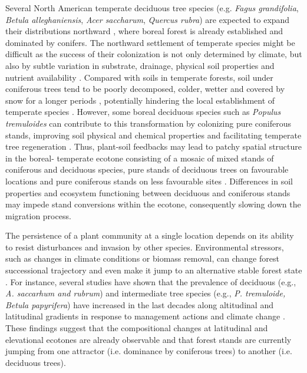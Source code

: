 Several North American temperate deciduous tree species (e.g. \textit{Fagus grandifolia},
\textit{Betula alleghaniensis}, \textit{Acer saccharum}, \textit{Quercus rubra}) are expected to
expand their distributions northward \citep{Iverson2002,Sciences2014}, where boreal forest is
already established and dominated by conifers. The northward settlement of temperate species might
be difficult as the success of their colonization is not only determined by climate, but also by
subtle variation in substrate, drainage, physical soil properties and nutrient availability
\citep{Goldblum2010, Lafleur2010, Brown2014}. Compared with soils in temperate forests, soil  under
coniferous trees tend to be poorly decomposed, colder, wetter and covered by snow for a longer
periods \citep{Barras1998, Lafleur2010, Goldblum2010}, potentially hindering the local establishment
of temperate species \citep{Lafleur2010, Brown2014}. However, some boreal deciduous species such as
\textit{Populus tremuloides} can contribute to this transformation by colonizing pure coniferous
stands, improving soil physical and chemical properties and facilitating temperate tree regeneration
\citep{Laganiere2009}. Thus, plant-soil feedbacks may lead to patchy spatial structure in the
boreal- temperate ecotone consisting of a mosaic of mixed stands of coniferous and deciduous
species, pure stands of deciduous trees on favourable locations and pure coniferous stands on less
favourable sites \citep{Goldblum2010, Fisichelli2013}. Differences in soil properties and ecosystem
functioning between deciduous and coniferous stands may impede stand conversions within the ecotone,
consequently slowing down the migration process.

The persistence of a plant community at a single location depends on its ability to resist
disturbances and invasion by other species. Environmental stressors, such as changes in climate
conditions or biomass removal, can change forest successional trajectory and even make it jump to an
alternative stable forest state \citep{Stringham2003}. For instance, several studies have shown that
the prevalence of deciduous (e.g., \textit{A. saccarhum and rubrum}) and intermediate tree species
(e.g., \textit{P. tremuloide, Betula papyrifera}) have increased in the last decades along
altitudinal and latitudinal gradients in response to management actions
\cite{Dupuis2011,Boucher2006} and climate change \citep{Beckage2008}. These findings suggest that
the compositional changes at latitudinal and elevational ecotones are already observable and that
forest stands are currently jumping from one attractor (i.e. dominance by coniferous trees) to
another (i.e. deciduous trees).

